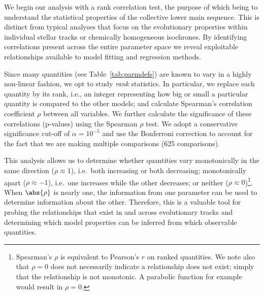 We begin our analysis with a rank correlation test, the purpose of which being to understand the 
statistical properties of the collective lower main sequence.
This is distinct from typical analyses that focus on the evolutionary properties within 
individual stellar tracks or chemically homogeneous isochrones. By identifying correlations present across the entire parameter space we reveal exploitable relationships available to model fitting and regression methods. 


Since many quantities (see Table~\ref{tab:parmdefs}) are known to vary in a highly non-linear fashion, we opt to study \emph{rank} statistics. In particular, we replace each quantity by its rank, i.e., an integer representing how big or small a particular quantity is compared to the other models; and calculate Spearman's correlation coefficient $\rho$ between all variables. We further calculate the significance of these correlations (p-values) using the Spearman $\rho$ test. We adopt a conservative significance cut-off of $\alpha = 10^{-5}$ and use the Bonferroni correction to account for the fact that we are making multiple comparisons (625 comparisons). 

This analysis allows us to determine whether quantities vary monotonically in the same direction ($\rho \approx 1$), i.e.~both increasing or both decreasing; monotonically apart ($\rho \approx -1$), i.e.~one increases while the other decreases; or neither ($\rho \approx 0$)\footnote{Spearman's $\rho$ is equivalent to Pearson's $r$ on ranked quantities. We note also that $\rho = 0$ does not necessarily indicate a  relationship does not exist; simply that the relationship is not monotonic. A parabolic function for example would result in $\rho = 0$.}. When $\abs{\rho}$ is nearly one, the information from one parameter can be used to determine information about the other. Therefore, this is a valuable tool for probing the relationships that exist in and across evolutionary tracks and determining which model properties can be inferred from which observable quantities. 

